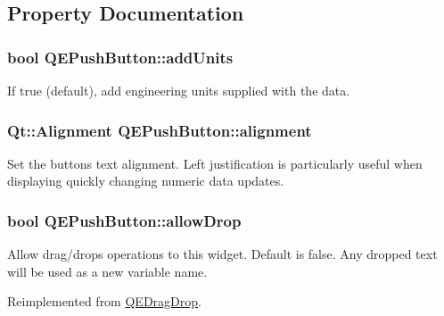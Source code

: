 \subsection{Property Documentation}
\hypertarget{classQEPushButton_a6a2b19a08245fb02d076f5ea954d4823}{
\subsubsection[{addUnits}]{\setlength{\rightskip}{0pt plus 5cm}bool QEPushButton::addUnits}}
\label{classQEPushButton_a6a2b19a08245fb02d076f5ea954d4823}
If true (default), add engineering units supplied with the data. \hypertarget{classQEPushButton_a5bc6e1c38e2ca091f3a74daa07f8433e}{
\subsubsection[{alignment}]{\setlength{\rightskip}{0pt plus 5cm}Qt::Alignment QEPushButton::alignment}}
\label{classQEPushButton_a5bc6e1c38e2ca091f3a74daa07f8433e}
Set the buttons text alignment. Left justification is particularly useful when displaying quickly changing numeric data updates. \hypertarget{classQEPushButton_a634514662515a307ecf680584cdf2cda}{
\subsubsection[{allowDrop}]{\setlength{\rightskip}{0pt plus 5cm}bool QEPushButton::allowDrop}}
\label{classQEPushButton_a634514662515a307ecf680584cdf2cda}
Allow drag/drops operations to this widget. Default is false. Any dropped text will be used as a new variable name. 

Reimplemented from \hyperlink{classQEDragDrop}{QEDragDrop}.

